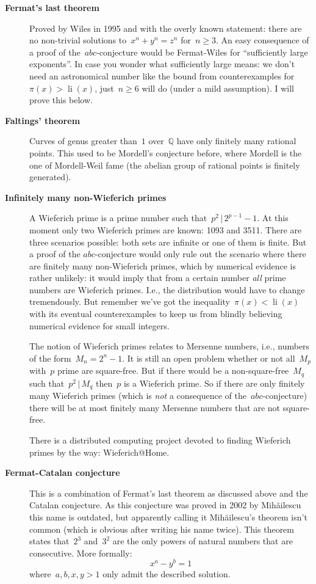 \begin{description}
  \item [\textbf{Fermat's last theorem}] Proved by Wiles in 1995 and with the overly known statement: there are no non-trivial solutions to~$x^n+y^n=z^n$ for~$n\geq 3$. An easy consequence of a proof of the~$abc$\nobreakdash-conjecture would be Fermat-Wiles for ``sufficiently large exponents''. In case you wonder what sufficiently large means: we don't need an astronomical number like the bound from counterexamples for~$\pi(x)>\operatorname{li}(x)$, just~$n\geq 6$ will do (under a mild assumption). I will prove this below.

  \item[\textbf{Faltings' theorem}] Curves of genus greater than~$1$ over~$\mathbb{Q}$ have only finitely many rational points. This used to be Mordell's conjecture before, where Mordell is the one of Mordell-Weil fame (the abelian group of rational points is finitely generated).

  \item[\textbf{Infinitely many non-Wieferich primes}] A Wieferich prime is a prime number such that~$p^2\,|\, 2^{p-1}-1$. At this moment only two Wieferich primes are known: 1093 and 3511. There are three scenarios possible: both sets are infinite or one of them is finite. But a proof of the $abc$\nobreakdash-conjecture would only rule out the scenario where there are finitely many non-Wieferich primes, which by numerical evidence is rather unlikely: it would imply that from a certain number \emph{all} prime numbers are Wieferich primes. I.e., the distribution would have to change tremendously. But remember we've got the inequality~$\pi(x)<\operatorname{li}(x)$ with its eventual counterexamples to keep us from blindly believing numerical evidence for small integers.

    The notion of Wieferich primes relates to Mersenne numbers, i.e., numbers of the form~$M_n=2^n-1$. It is still an open problem whether or not all~$M_p$ with~$p$ prime are square-free. But if there would be a non-square-free~$M_q$ such that~$p^2\,|\,M_q$ then~$p$ is a Wieferich prime. So if there are only finitely many Wieferich primes (which is \emph{not} a consequence of the~$abc$\nobreakdash-conjecture) there will be at most finitely many Mersenne numbers that are not square-free.

    There is a distributed computing project devoted to finding Wieferich primes by the way: Wieferich@Home.

  \item[\textbf{Fermat-Catalan conjecture}] This is a combination of Fermat's last theorem as discussed above and the Catalan conjecture. As this conjecture was proved in 2002 by Mih\u{a}ilescu this name is outdated, but apparently calling it Mih\u{a}ilescu's theorem isn't common (which is obvious after writing his name twice). This theorem states that~$2^3$ and~$3^2$ are the only powers of natural numbers that are consecutive. More formally:
    \begin{equation}
      x^a-y^b=1
    \end{equation}
    where~$a,b,x,y>1$ only admit the described solution.


\end{description}
